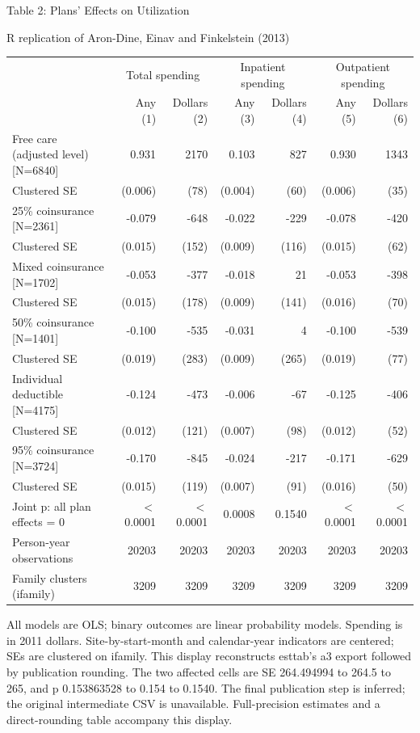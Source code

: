 \documentclass[11pt]{article}
\begin{document}
\begin{center}
{\Large Table 2: Plans' Effects on Utilization}\par\medskip
R replication of Aron-Dine, Einav and Finkelstein (2013)\par\bigskip
\begin{tabular}{lrrrrrr}\toprule
 & \multicolumn{2}{c}{Total spending} & \multicolumn{2}{c}{Inpatient spending} & \multicolumn{2}{c}{Outpatient spending} \\
 & Any (1) & Dollars (2) & Any (3) & Dollars (4) & Any (5) & Dollars (6) \\\midrule
Free care (adjusted level) [N=6840] & 0.931 & 2170 & 0.103 & 827 & 0.930 & 1343 \\
Clustered SE & (0.006) & (78) & (0.004) & (60) & (0.006) & (35) \\
25\% coinsurance [N=2361] & -0.079 & -648 & -0.022 & -229 & -0.078 & -420 \\
Clustered SE & (0.015) & (152) & (0.009) & (116) & (0.015) & (62) \\
Mixed coinsurance [N=1702] & -0.053 & -377 & -0.018 & 21 & -0.053 & -398 \\
Clustered SE & (0.015) & (178) & (0.009) & (141) & (0.016) & (70) \\
50\% coinsurance [N=1401] & -0.100 & -535 & -0.031 & 4 & -0.100 & -539 \\
Clustered SE & (0.019) & (283) & (0.009) & (265) & (0.019) & (77) \\
Individual deductible [N=4175] & -0.124 & -473 & -0.006 & -67 & -0.125 & -406 \\
Clustered SE & (0.012) & (121) & (0.007) & (98) & (0.012) & (52) \\
95\% coinsurance [N=3724] & -0.170 & -845 & -0.024 & -217 & -0.171 & -629 \\
Clustered SE & (0.015) & (119) & (0.007) & (91) & (0.016) & (50) \\
Joint p: all plan effects = 0 & $<$0.0001 & $<$0.0001 & 0.0008 & 0.1540 & $<$0.0001 & $<$0.0001 \\
Person-year observations & 20203 & 20203 & 20203 & 20203 & 20203 & 20203 \\
Family clusters (ifamily) & 3209 & 3209 & 3209 & 3209 & 3209 & 3209 \\
\bottomrule\end{tabular}\end{center}
\small All models are OLS; binary outcomes are linear probability models. Spending is in 2011 dollars.
Site-by-start-month and calendar-year indicators are centered; SEs are clustered on ifamily.
This display reconstructs esttab's a3 export followed by publication rounding.
The two affected cells are SE 264.494994 to 264.5 to 265, and p 0.153863528 to 0.154 to 0.1540.
The final publication step is inferred; the original intermediate CSV is unavailable.
Full-precision estimates and a direct-rounding table accompany this display.
\end{document}
